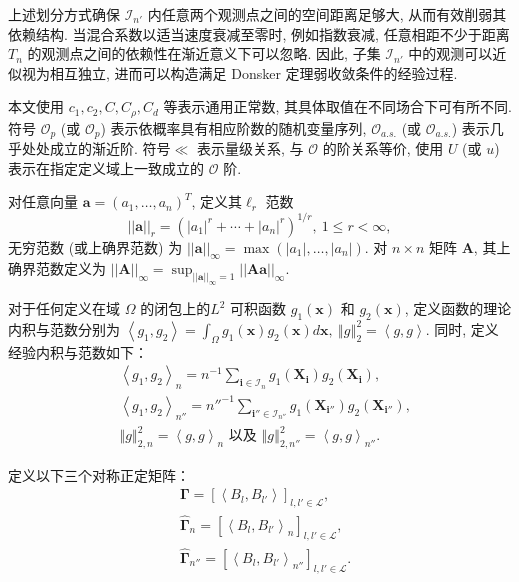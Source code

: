 \documentclass[a4paper,openay,14pt]{ctexbook}
\numberwithin{equation}{section}
\numberwithin{lem}{section}
\begin{document}
上述划分方式确保 $\mathcal{I}_{n'}$ 内任意两个观测点之间的空间距离足够大, 从而有效削弱其依赖结构. 当混合系数以适当速度衰减至零时, 例如指数衰减, 任意相距不少于距离 $T_n$ 的观测点之间的依赖性在渐近意义下可以忽略. 因此, 子集 $\mathcal{I}_{n'}$ 中的观测可以近似视为相互独立, 进而可以构造满足 Donsker 定理弱收敛条件的经验过程.

本文使用 $c_1, c_2, C, C_\rho, C_d$ 等表示通用正常数, 其具体取值在不同场合下可有所不同.
符号 $\mathcal{O}_p$ (或 $\scriptstyle{\mathcal{O}}_p$) 表示依概率具有相应阶数的随机变量序列,  $\mathcal{O}_{a.s.}$ (或 $\scriptstyle{\mathcal{O}}_{a.s.}$) 表示几乎处处成立的渐近阶.
符号$\ll$ 表示量级关系, 与 $\mathcal{O}$ 的阶关系等价, 使用 $U$ (或 $u$) 表示在指定定义域上一致成立的 $\mathcal{O}$ 阶.

对任意向量 $\mathbf{a} = \left(a_1, \ldots, a_n\right)^T$, 定义其$\ell_r$ 范数
$$||\mathbf{a}||_r = \left( |a_1|^r + \cdots + |a_n|^r \right)^{1/r},\ 1 \leq r < \infty,$$
无穷范数 (或上确界范数) 为
\(
||\mathbf{a}||_{\infty} = \max \left( |a_1|, \ldots, |a_n| \right).
\)
对 $n \times n$ 矩阵 $\mathbf{A}$, 其上确界范数定义为
\(||\mathbf{A}||_{\infty} = \sup_{||\mathbf{a}||_{\infty} = 1} ||\mathbf{A}\mathbf{a}||_{\infty}.\)

对于任何定义在域 $\Omega$ 的闭包上的$L^2$ 可积函数 $g_1(\boldsymbol{x})$ 和 $g_2(\boldsymbol{x})$, 定义函数的理论内积与范数分别为
\(\left<g_1,g_2\right> = \int_{\Omega}g_1(\boldsymbol{x})g_2(\boldsymbol{x})d\boldsymbol{x},~\left\Vert g\right\Vert^2_2 = \left<g,g\right>\). 同时, 定义经验内积与范数如下：
\begin{align*}
 &\left<g_1,g_2\right>_{n} = n^{-1}\sum_{\mathbf{i} \in \mathcal{I}_n} g_1(\boldsymbol{X}_{\mathbf{i}})g_2(\boldsymbol{X}_{\mathbf{i}}),\\
 & \left<g_1,g_2\right>_{n''} = n''^{-1}\sum_{\mathbf{i}''\in\mathcal{I}_{n''}}g_1(\boldsymbol{X}_{\mathbf{i}''})g_2(\boldsymbol{X}_{\mathbf{i}''}),\\
 & \left\Vert g\right\Vert^{2}_{2,n} = \left<g,g\right>_{n}\text{ 以及 } \left\Vert g\right\Vert^{2}_{2,n''} = \left<g,g\right>_{n''}.
\end{align*}

定义以下三个对称正定矩阵：
\begin{align}
    &\bm{\Gamma} = \left[\left\langle B_l,B_{l'}\right\rangle\right]_{l,l'\in\mathcal{L}}, \label{EQU:Gammalambda}\\
    &\hat{\bm{\Gamma}}_{n} = \left[\left\langle B_l,B_{l'}\right\rangle_{n}\right]_{l,l'\in\mathcal{L}},\label{EQU:hatGammalambdan}\\
    &\hat{\bm{\Gamma}}_{n''} = \left[\left\langle B_l,B_{l'}\right\rangle_{n''}\right]_{l,l'\in\mathcal{L}}. \label{EQU:hatGammalambdan''}
\end{align}
\end{document}
